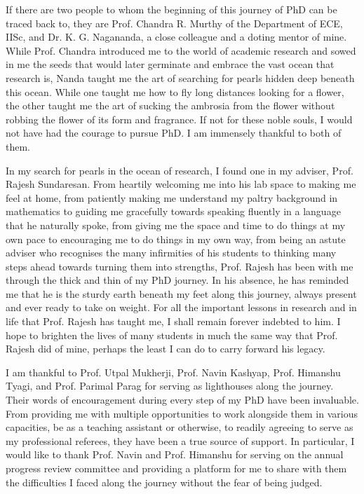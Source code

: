 If there are two people to whom the beginning of this journey of PhD can be traced back to, they are Prof. Chandra R. Murthy of the Department of ECE, IISc, and Dr. K. G. Nagananda, a close colleague and a doting mentor of mine. While Prof. Chandra introduced me to the world of academic research and sowed in me the seeds that would later germinate and embrace the vast ocean that research is, Nanda taught me the art of searching for pearls hidden deep beneath this ocean. While one taught me how to fly long distances looking for a flower, the other taught me the art of sucking the ambrosia from the flower without robbing the flower of its form and fragrance. If not for these noble souls, I would not have had the courage to pursue PhD. I am immensely thankful to both of them.

In my search for pearls in the ocean of research, I found one in my adviser, Prof. Rajesh Sundaresan. From heartily welcoming me into his lab space to making me feel at home, from patiently making me understand my paltry background in mathematics to guiding me gracefully towards speaking fluently in a language that he naturally spoke, from giving me the space and time to do things at my own pace to encouraging me to do things in my own way, from being an astute adviser who recognises the many infirmities of his students to thinking many steps ahead towards turning them into strengths, Prof. Rajesh has been with me through the thick and thin of my PhD journey. In his absence, he has reminded me that he is the sturdy earth beneath my feet along this journey, always present and ever ready to take on weight. For all the important lessons in research and in life that Prof. Rajesh has taught me, I shall remain forever indebted to him. I hope to brighten the lives of many students in much the same way that Prof. Rajesh did of mine, perhaps the least I can do to carry forward his legacy.

I am thankful to Prof. Utpal Mukherji, Prof. Navin Kashyap, Prof. Himanshu Tyagi, and Prof. Parimal Parag for serving as lighthouses along the journey. Their words of encouragement during every step of my PhD have been invaluable. From providing me with multiple opportunities to work alongside them in various capacities, be as a teaching assistant or otherwise, to readily agreeing to serve as my professional referees, they have been a true source of support. In particular, I would like to thank Prof. Navin and Prof. Himanshu for serving on the annual progress review committee and providing a platform for me to share with them the difficulties I faced along the journey without the fear of being judged. 

